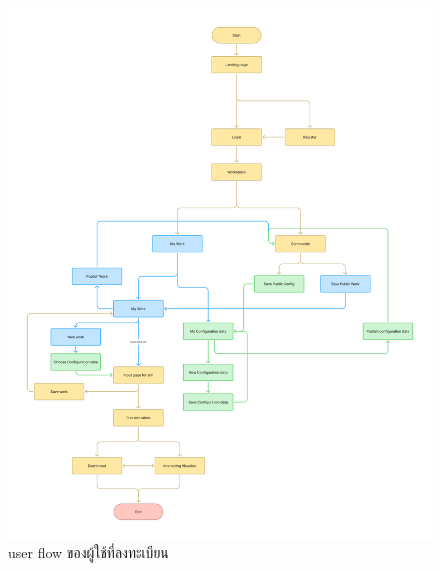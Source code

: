 \begin{mypara}
\begin{itemize}
\begin{figure}[H]
    \centering
    \includegraphics[width=\textwidth,height=0.9\textheight,keepaspectratio]{User_flow_-_login.png}
    \caption{user flow ของผู้ใช้ที่ลงทะเบียน}
    \label{fig:UserFlowRegistered}
    \end{figure}
    

\end{itemize}
\end{mypara}
\newpage
